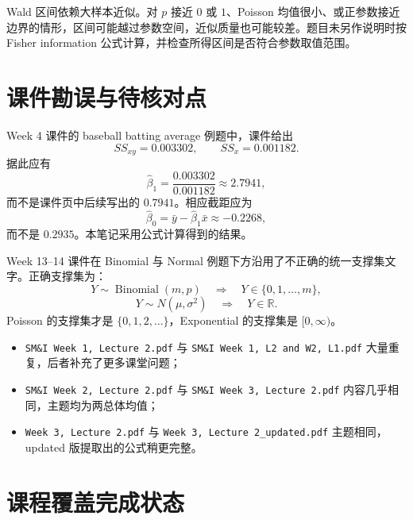 \documentclass[11pt,a4paper]{article}
\theoremstyle{definition}
\theoremstyle{plain}
\theoremstyle{remark}
\begin{document}
\begin{warnbox}[渐近推断的边界问题]
Wald 区间依赖大样本近似。对 $p$ 接近 $0$ 或 $1$、Poisson 均值很小、或正参数接近边界的情形，区间可能越过参数空间，近似质量也可能较差。题目未另作说明时按 Fisher information 公式计算，并检查所得区间是否符合参数取值范围。
\end{warnbox}

\section{课件勘误与待核对点}
\label{sec:errata}

\begin{warnbox}
Week 4 课件的 baseball batting average 例题中，课件给出
\[
    SS_{xy}=0.003302,\qquad SS_x=0.001182.
\]
据此应有
\[
    \hat\beta_1=\frac{0.003302}{0.001182}\approx 2.7941,
\]
而不是课件页中后续写出的 $0.7941$。相应截距应为
\[
    \hat\beta_0=\bar y-\hat\beta_1\bar x\approx -0.2268,
\]
而不是 $0.2935$。本笔记采用公式计算得到的结果。
\end{warnbox}

\begin{warnbox}
Week 13--14 课件在 Binomial 与 Normal 例题下方沿用了不正确的统一支撑集文字。正确支撑集为：
\[
    Y\sim\operatorname{Binomial}(m,p)
    \quad\Longrightarrow\quad
    Y\in\{0,1,\ldots,m\},
\]
\[
    Y\sim N(\mu,\sigma^2)
    \quad\Longrightarrow\quad
    Y\in\mathbb R.
\]
Poisson 的支撑集才是 $\{0,1,2,\ldots\}$，Exponential 的支撑集是 $[0,\infty)$。
\end{warnbox}

\begin{sourcebox}[重复课件关系]
\begin{itemize}
    \item \texttt{SM\&I Week 1, Lecture 2.pdf} 与 \texttt{SM\&I Week 1, L2 and W2, L1.pdf} 大量重复，后者补充了更多课堂问题；
    \item \texttt{SM\&I Week 2, Lecture 2.pdf} 与 \texttt{SM\&I Week 3, Lecture 2.pdf} 内容几乎相同，主题均为两总体均值；
    \item \texttt{Week 3, Lecture 2.pdf} 与 \texttt{Week 3, Lecture 2\_updated.pdf} 主题相同，updated 版提取出的公式稍更完整。
\end{itemize}
\end{sourcebox}

\newpage
\section*{课程覆盖完成状态}
\end{document}
